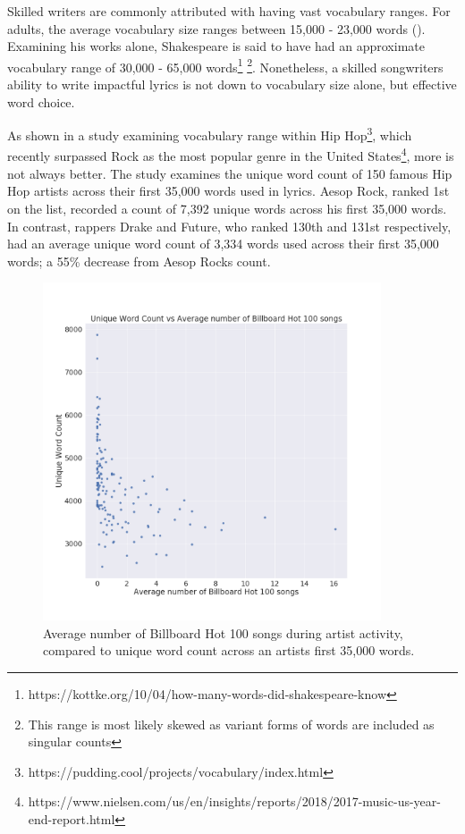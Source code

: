 \noindent
\newline
Skilled writers are commonly attributed with having vast vocabulary ranges. For adults, the average vocabulary size ranges between 15,000 - 23,000 words (\cite{McCrum2011}). Examining his works alone, Shakespeare is said to have had an approximate vocabulary range of 30,000 - 65,000 words\footnote{https://kottke.org/10/04/how-many-words-did-shakespeare-know} \footnote{This range is most likely skewed as variant forms of words are included as singular counts}. Nonetheless, a skilled songwriters ability to write impactful lyrics is not down to vocabulary size alone, but effective word choice.
 
\noindent
\newline
As shown in a study examining vocabulary range within Hip Hop\footnote{https://pudding.cool/projects/vocabulary/index.html}, which recently surpassed Rock as the most popular genre in the United States\footnote{https://www.nielsen.com/us/en/insights/reports/2018/2017-music-us-year-end-report.html}, more is not always better. The study examines the unique word count of 150 famous Hip Hop artists across their first 35,000 words used in lyrics. Aesop Rock, ranked 1st on the list, recorded a count of 7,392 unique words across his first 35,000 words. In contrast, rappers Drake and Future, who ranked 130th and 131st respectively, had an average unique word count of 3,334 words used across their first 35,000 words; a 55\% decrease from Aesop Rocks count. 
\begin{figure}[h]	
	\includegraphics[width=10cm, height=10cm]{./figures/fig1}
	\centering
	\caption[Average Number of Billboard Hot 100 songs vs Unique Word Count]{Average number of Billboard Hot 100 songs during artist activity, compared to unique word count across an artists first 35,000 words.}
	\label{fig:fig1}
\end{figure}

